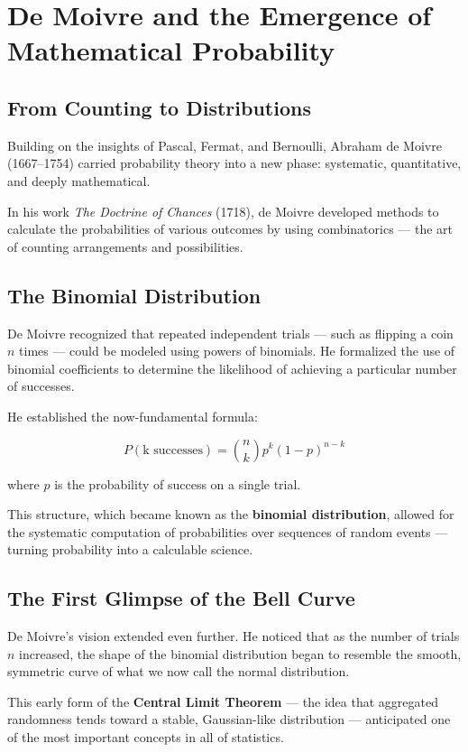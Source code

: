 \section{De Moivre and the Emergence of Mathematical Probability}

\subsection{From Counting to Distributions}

Building on the insights of Pascal, Fermat, and Bernoulli, Abraham de Moivre (1667--1754) carried probability theory into a new phase: systematic, quantitative, and deeply mathematical.

In his work \textit{The Doctrine of Chances} (1718), de Moivre developed methods to calculate the probabilities of various outcomes by using combinatorics — the art of counting arrangements and possibilities.

\subsection{The Binomial Distribution}

De Moivre recognized that repeated independent trials — such as flipping a coin \( n \) times — could be modeled using powers of binomials. He formalized the use of binomial coefficients to determine the likelihood of achieving a particular number of successes.

He established the now-fundamental formula:

\[
P(\text{k successes}) = \binom{n}{k} p^k (1-p)^{n-k}
\]

where \( p \) is the probability of success on a single trial.

This structure, which became known as the \textbf{binomial distribution}, allowed for the systematic computation of probabilities over sequences of random events — turning probability into a calculable science.

\subsection{The First Glimpse of the Bell Curve}

De Moivre's vision extended even further. He noticed that as the number of trials \( n \) increased, the shape of the binomial distribution began to resemble the smooth, symmetric curve of what we now call the normal distribution.

This early form of the \textbf{Central Limit Theorem} — the idea that aggregated randomness tends toward a stable, Gaussian-like distribution — anticipated one of the most important concepts in all of statistics.

